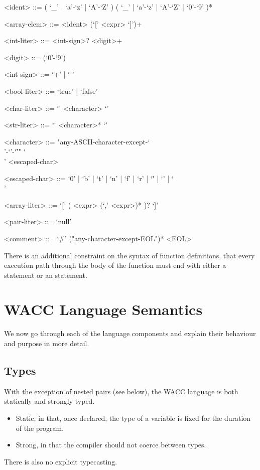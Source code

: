 \documentclass[a4paper]{article}
\theoremstyle{definition}
\begin{document}
\begin{grammar}
  <ident> ::= ( `\_' | `a'-`z' | `A'-`Z' ) ( `\_' | `a'-`z' | `A'-`Z' | `0'-`9' )*      
  
  <array-elem> ::= <ident> (`[' <expr> `]')+ 
  
  <int-liter> ::= <int-sign>? <digit>+ 

  <digit> ::= (`0'-`9')
  
  <int-sign> ::= `+' | `-'  
  
  <bool-liter> ::= `true' | `false'
  
  <char-liter> ::= `\textquotesingle' <character> `\textquotesingle'  

  <str-liter> ::= `\"' <character>* `\"'  
  
  <character> ::= "any-ASCII-character-except-`\\'-`\textquotesingle'-`\"'" 
    \alt `\\' <escaped-char>   

  <escaped-char> ::= `0' | `b' | `t' | `n' | `f' | `r' | `\"' | `\textquotesingle' | `\\'

  <array-liter> ::= `[' ( <expr> (`,' <expr>)* )? `]' 

  <pair-liter> ::= `null'
    
  <comment> ::= `#' ("any-character-except-EOL")* <EOL>  
\end{grammar}

 There is an additional constraint on the syntax of function definitions, 
that every execution path through the body of the function must end with either a  statement or an  statement.


\section{WACC Language Semantics}
We now go through each of the language components and explain their behaviour and purpose in more detail.

\subsection{Types}
With the exception of nested pairs (see below), the WACC language is both statically and strongly typed.
\begin{itemize}
  \item Static, in that, once declared, the type of a variable is fixed for the duration of the program. 
  \item Strong, in that the compiler should not coerce between types.
\end{itemize}
There is also no explicit typecasting.
\end{document}
